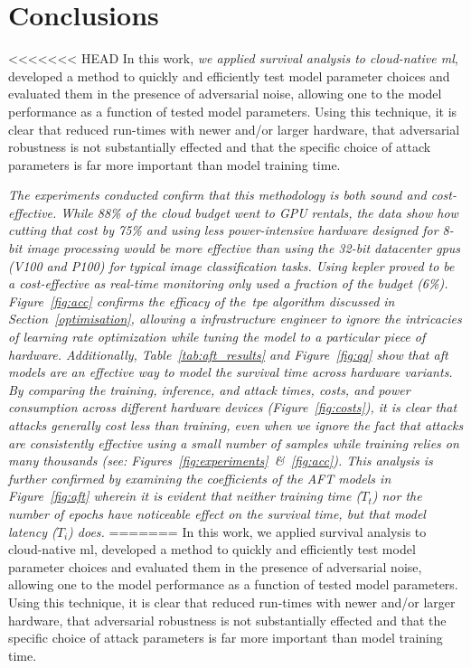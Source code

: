 \documentclass[sn-mathphys-num]{sn-jnl}%
\newcommand{\cm}[1]{\textit{{\color{blue}#1}}}
\begin{document}
\section{Conclusions}
\label{conclusion}

<<<<<<< HEAD
In this work, \cm{we applied survival analysis to cloud-native \acrshort{ml}}, developed a method to quickly and efficiently test model parameter choices and evaluated them in the presence of adversarial noise, allowing one to the model performance as a function of tested model parameters.
Using this technique, it is clear that reduced run-times with newer and/or larger hardware, that adversarial robustness is not substantially effected and that the specific choice of attack parameters is far more important than model training time.

\cm{The experiments conducted confirm that this methodology is both sound and cost-effective. While 88\% of the cloud budget went to GPU rentals, the data show how cutting that cost by 75\% and using less power-intensive hardware designed for 8-bit image processing would be \textit{more} effective than using the 32-bit datacenter \acrshort{gpu}s (V100 and P100) for typical image classification tasks. Using \acrshort{kepler} proved to be a cost-effective as real-time monitoring only used a fraction of the budget (6\%).
Figure~\ref{fig:acc} confirms the efficacy of the~\acrshort{tpe} algorithm discussed in Section~\ref{optimisation}, allowing a infrastructure engineer to ignore the intricacies of learning rate optimization while tuning the model to a particular piece of hardware.
Additionally, Table~\ref{tab:aft_results} and Figure~\ref{fig:qq} show that \acrshort{aft} models are an effective way to model the survival time across hardware variants.
By comparing the training, inference, and attack  times, costs, and power consumption across different hardware devices (Figure~\ref{fig:costs}), it is clear that attacks generally cost less than training, even when we ignore the fact that attacks are consistently effective using a small number of samples while training relies on many thousands (see: Figures~\ref{fig:experiments}~\&~\ref{fig:acc}).
This analysis is further confirmed by examining the coefficients of the AFT models in Figure~\ref{fig:aft} wherein it is evident that neither training time ($T_t$) nor the number of epochs have noticeable effect on the survival time, but that model latency ($T_i$) does.}
=======
In this work, we applied survival analysis to cloud-native \acrshort{ml}, developed a method to quickly and efficiently test model parameter choices and evaluated them in the presence of adversarial noise, allowing one to the model performance as a function of tested model parameters.
Using this technique, it is clear that reduced run-times with newer and/or larger hardware, that adversarial robustness is not substantially effected and that the specific choice of attack parameters is far more important than model training time. 
\end{document}
